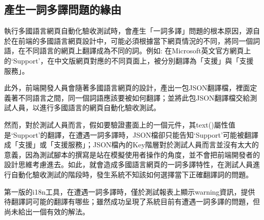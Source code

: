 \subsection{產生一詞多譯問題的緣由}
執行多國語言網頁自動化驗收測試時，會產生「一詞多譯」問題的根本原因，源自於在前端的多國語言網頁設計中，可能必須根據當下網頁情況的不同，將同一個詞語，在不同語言的網頁上翻譯成為不同的詞。例如: 在Microsoft英文官方網頁上的‘Support’，在中文版網頁對應的不同頁面上，被分別翻譯為「支援」與「支援服務」。

此外，前端開發人員會隨著多國語言網頁的設計，產出一包JSON翻譯檔，裡面定義著不同語言之間，同一個詞語應該要被如何翻譯；並將此包JSON翻譯檔交給測試人員，以進行多國語言的網頁自動化驗收測試。

然而，對於測試人員而言，假如要驗證畫面上的一個元件，其text()屬性值是‘Support’的翻譯，在遭遇一詞多譯時，JSON檔卻只能告知‘Support’可能被翻譯成「支援」或「支援服務」；JSON檔內的Key階層對於測試人員而言並沒有太大的意義，因為測試腳本的撰寫是站在模擬使用者操作的角度，並不會把前端開發者的設計思維考慮進去。如此，就會造成多國語言網頁的一詞多譯特性，在測試人員進行自動化驗收測試的階段時，發生系統不知該如何選擇當下正確翻譯詞的問題。

第一版的i18n工具，在遭遇一詞多譯時，僅於測試報表上顯示warning資訊，提供待翻譯詞可能的翻譯有哪些；雖然成功呈現了系統目前有遭遇一詞多譯的問題，但尚未給出一個有效的解法。
